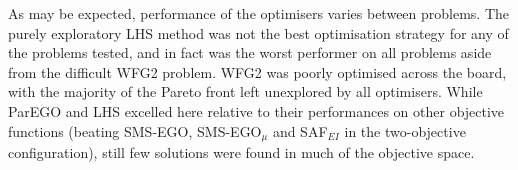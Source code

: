 \documentclass[conference]{IEEEtran}
\DeclareMathOperator*{\igdp}{IGD^{+}}
\newcommand\hpv{dominated hypervolume\xspace}
\newcommand\safei{SAF$_{EI}$\xspace}
\newcommand\smsego{SMS-EGO\xspace}
\newcommand\smsegomu{SMS-EGO$_{\mu}$\xspace}
\newcommand\parego{ParEGO\xspace}
\newcommand\lhs{LHS\xspace}
\newcommand{\rmenote}[2][\textcolor{magenta}{\dagger}]{$#1$\marginpar{\color{magenta}\raggedright\tiny$#1$ #2}}
\newcommand{\fnote}[2][\textcolor{teal}{\dagger}]{$#1$\marginpar{\color{teal}\raggedright\tiny$#1$
    #2}}
\begin{document}
As may be expected, performance of the optimisers varies between problems. The purely exploratory \lhs method was not the best optimisation strategy for any of the problems tested, and in fact was the worst performer on all problems aside from the difficult WFG2 problem. WFG2 was poorly optimised across the board, with the majority of the Pareto front left unexplored by all optimisers. While \parego and \lhs excelled here relative to their performances on other objective functions (beating \smsego, \smsegomu and \safei in the two-objective configuration), still few solutions were found in much of the objective space.

\end{document}
